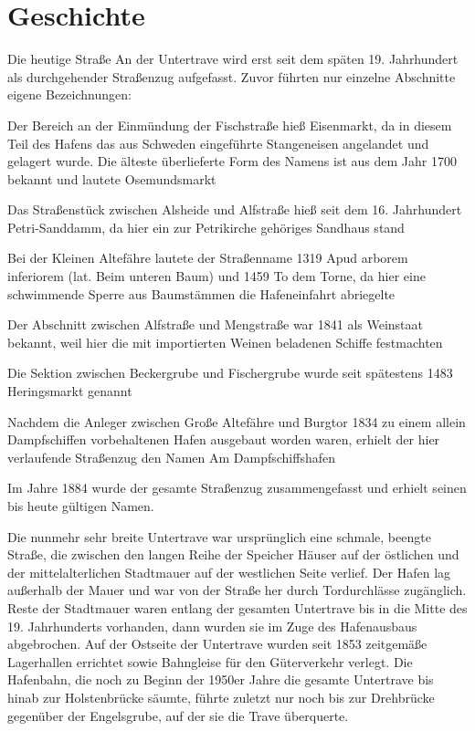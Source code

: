 
\chapter{Geschichte}
\label{chapter-geschichte}

Die heutige Straße An der Untertrave wird erst seit dem späten 19. Jahrhundert als durchgehender Straßenzug aufgefasst. Zuvor führten nur einzelne Abschnitte eigene Bezeichnungen:

\begin{compactitem}
\item Der Bereich an der Einmündung der Fischstraße hieß Eisenmarkt, da in diesem Teil des Hafens das aus Schweden eingeführte Stangeneisen angelandet und gelagert wurde. Die älteste überlieferte Form des Namens ist aus dem Jahr 1700 bekannt und lautete Osemundsmarkt
\item Das Straßenstück zwischen Alsheide und Alfstraße hieß seit dem 16. Jahrhundert Petri-Sanddamm, da hier ein zur Petrikirche gehöriges Sandhaus stand
\item Bei der Kleinen Altefähre lautete der Straßenname 1319 Apud arborem inferiorem (lat. Beim unteren Baum) und 1459 To dem Torne, da hier eine schwimmende Sperre aus Baumstämmen die Hafeneinfahrt abriegelte
\item Der Abschnitt zwischen Alfstraße und Mengstraße war 1841 als Weinstaat bekannt, weil hier die mit importierten Weinen beladenen Schiffe festmachten
\item Die Sektion zwischen Beckergrube und Fischergrube wurde seit spätestens 1483 Heringsmarkt genannt
\item Nachdem die Anleger zwischen Große Altefähre und Burgtor 1834 zu einem allein Dampfschiffen vorbehaltenen Hafen ausgebaut worden waren, erhielt der hier verlaufende Straßenzug den Namen Am Dampfschiffshafen
\end{compactitem}

Im Jahre 1884 wurde der gesamte Straßenzug zusammengefasst und erhielt seinen bis heute gültigen Namen.

Die nunmehr sehr breite Untertrave war ursprünglich eine schmale, beengte Straße, die zwischen den langen Reihe der Speicher Häuser auf der östlichen und der mittelalterlichen Stadtmauer auf der westlichen Seite verlief. Der Hafen lag außerhalb der Mauer und war von der Straße her durch Tordurchlässe zugänglich. Reste der Stadtmauer waren entlang der gesamten Untertrave bis in die Mitte des 19. Jahrhunderts vorhanden, dann wurden sie im Zuge des Hafenausbaus abgebrochen. Auf der Ostseite der Untertrave wurden seit 1853 zeitgemäße Lagerhallen errichtet sowie Bahngleise für den Güterverkehr verlegt. Die Hafenbahn, die noch zu Beginn der 1950er Jahre die gesamte Untertrave bis hinab zur Holstenbrücke säumte, führte zuletzt nur noch bis zur Drehbrücke gegenüber der Engelsgrube, auf der sie die Trave überquerte.

